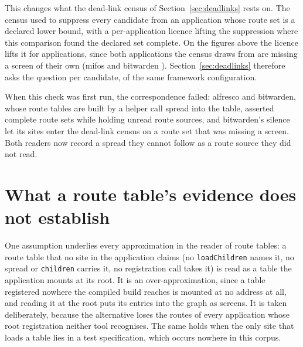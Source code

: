 This changes what the dead-link census of Section~\ref{sec:deadlinks} rests on. The census used to suppress every candidate from an application whose route set is a declared lower bound, with a per-application licence lifting the suppression where this comparison found the declared set complete. On the figures above the licence lifts it for \RoundTwoProbeLifted{} applications, since both applications the census draws from are missing a screen of their own (mifos \ProbeMissedMifos{} and bitwarden \ProbeMissedBitwarden{}). Section~\ref{sec:deadlinks} therefore asks the question per candidate, of the same framework configuration.

When this check was first run, the correspondence failed: alfresco and bitwarden, whose route tables are built by a helper call spread into the table, asserted complete route sets while holding unread route sources, and bitwarden's silence let its sites enter the dead-link census on a route set that was missing a screen. Both readers now record a spread they cannot follow as a route source they did not read.

\section{What a route table's evidence does not establish}
\label{sec:ownership}

One assumption underlies every approximation in the reader of route tables: a route table that no site in the application claims (no \texttt{loadChildren} names it, no spread or \texttt{children} carries it, no registration call takes it) is read as a table the application mounts at its root. It is an over-approximation, since a table registered nowhere the compiled build reaches is mounted at no address at all, and reading it at the root puts its entries into the graph as screens. It is taken deliberately, because the alternative loses the routes of every application whose root registration neither tool recognises. The same holds when the only site that loads a table lies in a test specification, which occurs nowhere in this corpus.

